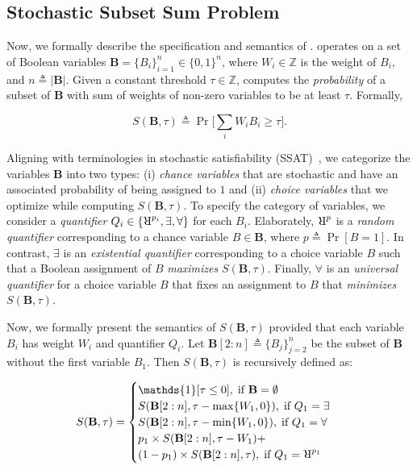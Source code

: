 \subsection{Stochastic Subset Sum Problem}\label{fvgm_sec:stochastic_sum_set_sum}
Now, we formally describe the specification and semantics of {\stochastic}.
{\stochastic} operates on  a set of Boolean variables $ \mathbf{B} = \{B_i\}_{i=1}^{n} \in \{0,1\}^{n} $, where $ W_i \in \mathbb{Z} $ is the weight of $ B_i $, and $n \triangleq |\mathbf{B}|$. Given a constant threshold $ \tau \in \mathbb{Z} $, {\stochastic} computes the \textit{probability} of a subset of $ \mathbf{B} $ with sum of weights of non-zero variables to be at least $ \tau $. Formally,

\[S(\mathbf{B}, \tau) \triangleq \Pr\Big[\sum_{i} W_iB_i \ge \tau \Big].\]

Aligning with terminologies in stochastic satisfiability (SSAT)~\cite{littman2001stochastic}, we categorize the variables $ \mathbf{B} $ into two types: (i) \textit{chance variables} that are stochastic and have an associated probability of being assigned to $ 1 $ and (ii) \textit{choice variables} that we  optimize while computing $ S(\mathbf{B}, \tau) $.  To specify the category of variables, we consider a \textit{quantifier} $ Q_i \in \{\R^{p_i}, \exists, \forall\} $ for each $ B_i $. Elaborately, $ \R^{p} $ is a \textit{random quantifier} corresponding to a chance variable $ B \in \mathbf{B} $, where  $ p\triangleq \Pr[B = 1]$. In contrast, $ \exists $ is an \textit{existential quantifier} corresponding to a choice variable $ B $ such that a Boolean assignment of $ B $  \textit{maximizes}  $ S(\mathbf{B}, \tau) $. Finally, $ \forall $ is an \textit{universal quantifier} for a choice variable $ B $ that fixes an assignment to $ B $ that \textit{minimizes} $ S(\mathbf{B}, \tau) $. 
 
Now, we formally present the semantics of $ S(\mathbf{B}, \tau) $ provided that each variable $ B_i $ has weight $ W_i $ and quantifier $ Q_i $. Let  $ \mathbf{B}[2:n] \triangleq \{B_j\}_{j=2}^{n} $ be the subset of $\mathbf{B}$ without the first variable $ B_1 $. Then $ S(\mathbf{B}, \tau) $ is recursively defined as:


\begin{align}\label{fvgm_eq:semantics_recurse}
  S(\mathbf{B},\tau) =
 \begin{cases}
 \mathds{1}[ \tau \le 0 ], \; \text{if } \textbf{B} = \emptyset \\
 S(\mathbf{B}[2:n],\tau - \max\{W_1, 0\}), \; \text{if } Q_1 = \exists\\
 S(\mathbf{B}[2:n],\tau - \min\{W_1, 0\}), \; \text{if } Q_1 = \forall\\
 p_1\times S(\mathbf{B}[2:n],\tau - W_1) +\\ (1-p_1)\times S(\mathbf{B}[2:n],\tau),\; \text{if } Q_1 = \R^{p_1}
 \end{cases}
\end{align} 


